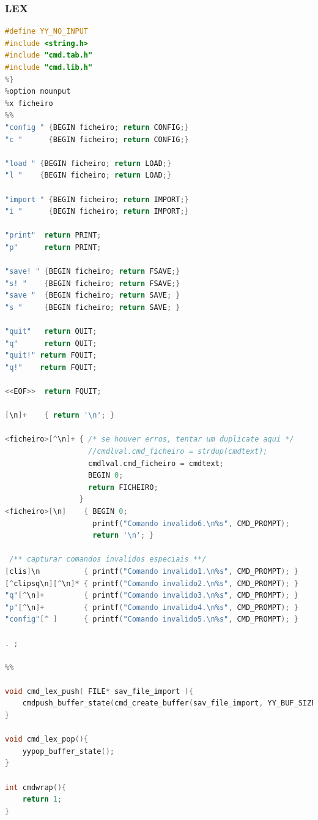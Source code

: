 \documentclass[11pt, a4paper, oneside]{article}
\begin{document}
\subsubsection{LEX}
\begin{lstlisting}[language=C, caption={LEX do ficheiro cmd.}]
%{
#define YY_NO_INPUT
#include <string.h>
#include "cmd.tab.h"
#include "cmd.lib.h"
%}
%option nounput
%x ficheiro
%%
"config " {BEGIN ficheiro; return CONFIG;}
"c "      {BEGIN ficheiro; return CONFIG;}

"load " {BEGIN ficheiro; return LOAD;}
"l "    {BEGIN ficheiro; return LOAD;}

"import " {BEGIN ficheiro; return IMPORT;}
"i "      {BEGIN ficheiro; return IMPORT;}

"print"  return PRINT;
"p"      return PRINT;

"save! " {BEGIN ficheiro; return FSAVE;}
"s! "    {BEGIN ficheiro; return FSAVE;}
"save "  {BEGIN ficheiro; return SAVE; }
"s "     {BEGIN ficheiro; return SAVE; }

"quit"   return QUIT;
"q"      return QUIT;
"quit!" return FQUIT;
"q!"    return FQUIT;

<<EOF>>  return FQUIT;

[\n]+    { return '\n'; }

<ficheiro>[^\n]+ { /* se houver erros, tentar um duplicate aqui */
                   //cmdlval.cmd_ficheiro = strdup(cmdtext);
                   cmdlval.cmd_ficheiro = cmdtext;
                   BEGIN 0;
                   return FICHEIRO;
                 }
<ficheiro>[\n]    { BEGIN 0;
                    printf("Comando invalido6.\n%s", CMD_PROMPT);
                    return '\n'; }

 /** capturar comandos invalidos especiais **/
[clis]\n          { printf("Comando invalido1.\n%s", CMD_PROMPT); }
[^clipsq\n][^\n]* { printf("Comando invalido2.\n%s", CMD_PROMPT); }
"q"[^\n]+         { printf("Comando invalido3.\n%s", CMD_PROMPT); }
"p"[^\n]+         { printf("Comando invalido4.\n%s", CMD_PROMPT); }
"config"[^ ]      { printf("Comando invalido5.\n%s", CMD_PROMPT); }

. ;

%%

void cmd_lex_push( FILE* sav_file_import ){
    cmdpush_buffer_state(cmd_create_buffer(sav_file_import, YY_BUF_SIZE));
}

void cmd_lex_pop(){
    yypop_buffer_state();
}

int cmdwrap(){
    return 1;
}
\end{lstlisting}
\end{document}
